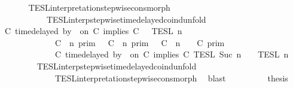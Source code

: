 \begin{isabellebody}
\ \ \ \ \ \ \isamarkupfalse%
\ TESL{\isacharunderscore}interpretation{\isacharunderscore}stepwise{\isacharunderscore}cons{\isacharunderscore}morph\isanewline
\ \ \ \ \ \ \ \ \ \ \ \ TESL{\isacharunderscore}interp{\isacharunderscore}stepwise{\isacharunderscore}timedelayed{\isacharunderscore}coind{\isacharunderscore}unfold\isanewline
\ \ \ \ \isamarkupfalse%
\ {\isacharminus}\isanewline
\ \ \ \ \ \ \isamarkupfalse%
\ {\isacartoucheopen}{\isasymlbrakk}{\isasymlbrakk}\ {\isacharparenleft}C\ time{\isacharminus}delayed\ by\ {\isasymdelta}{\isasymtau}\ on\ C\ implies\ C\ {\isacharhash}\ {\isasymPsi}\ {\isasymrbrakk}{\isasymrbrakk}\isactrlsub T\isactrlsub E\isactrlsub S\isactrlsub L\isactrlbsup {\isasymge}\ n\isactrlesup \isanewline
\ \ \ \ \ \ \ \ \ \ \ \ {\isacharequal}\ {\isacharparenleft}{\isasymlbrakk}\ C\ {\isasymnot}{\isasymUp}\ n\ {\isasymrbrakk}\isactrlsub p\isactrlsub r\isactrlsub i\isactrlsub m\ {\isasymunion}\ {\isasymlbrakk}\ C\ {\isasymUp}\ n\ {\isasymrbrakk}\isactrlsub p\isactrlsub r\isactrlsub i\isactrlsub m\ {\isasyminter}\ {\isasymlbrakk}\ C\ {\isacharat}\ n\ {\isasymoplus}\ {\isasymdelta}{\isasymtau}\ {\isasymRightarrow}\ C\ {\isasymrbrakk}\isactrlsub p\isactrlsub r\isactrlsub i\isactrlsub m{\isacharparenright}\isanewline
\ \ \ \ \ \ \ \ \ \ \ \ {\isasyminter}\ {\isasymlbrakk}\ C\ time{\isacharminus}delayed\ by\ {\isasymdelta}{\isasymtau}\ on\ C\ implies\ C\ {\isasymrbrakk}\isactrlsub T\isactrlsub E\isactrlsub S\isactrlsub L\isactrlbsup {\isasymge}\ Suc\ n\isactrlesup \ {\isasyminter}\ {\isasymlbrakk}{\isasymlbrakk}\ {\isasymPsi}\ {\isasymrbrakk}{\isasymrbrakk}\isactrlsub T\isactrlsub E\isactrlsub S\isactrlsub L\isactrlbsup {\isasymge}\ n\isactrlesup {\isacartoucheclose}\isanewline
\ \ \ \ \ \ \ \ \isamarkupfalse%
\ TESL{\isacharunderscore}interp{\isacharunderscore}stepwise{\isacharunderscore}timedelayed{\isacharunderscore}coind{\isacharunderscore}unfold\isanewline
\ \ \ \ \ \ \ \ \ \ \ \ \ \ TESL{\isacharunderscore}interpretation{\isacharunderscore}stepwise{\isacharunderscore}cons{\isacharunderscore}morph\ \isamarkupfalse%
\ blast\isanewline
\ \ \ \ \ \ \isamarkupfalse%
\ \isamarkupfalse%
\ {\isacharquery}thesis\isanewline
\ \ \ \ \ \ \ \ \isamarkupfalse%

\end{isabellebody}
